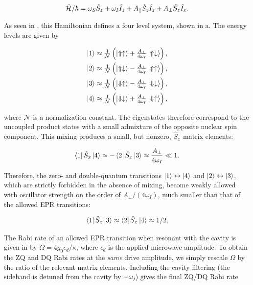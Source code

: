 \begin{equation}
    \hat{\mathcal{H}}_{\text{}}/\hbar = \omega_S \hat{S}_z + \omega_I \hat{I}_z + A_\parallel \hat{S}_z \hat{I}_z + A_\perp \hat{S}_z \hat{I}_x.
\end{equation}

As seen in , this Hamiltonian defines a four level system, shown in a. The energy levels are given by

\begin{align}
\begin{split}
    \ket{1} &\approx \tfrac{1}{\mathcal{N}}\left(\ket{\Uparrow\uparrow}     + \tfrac{A_\perp}{4\omega_I} \ket{\Uparrow\downarrow}\right) , \\
    \ket{2} &\approx \tfrac{1}{\mathcal{N}}\left(\ket{\Uparrow\downarrow}   - \tfrac{A_\perp}{4\omega_I} \ket{\Uparrow\uparrow}\right), \\
    \ket{3} &\approx \tfrac{1}{\mathcal{N}}\left(\ket{\Downarrow\uparrow}   - \tfrac{A_\perp}{4\omega_I} \ket{\Downarrow\downarrow}\right) , \\
    \ket{4} &\approx \tfrac{1}{\mathcal{N}}\left(\ket{\Downarrow\downarrow} + \tfrac{A_\perp}{4\omega_I} \ket{\Downarrow\uparrow}\right),
\end{split}
\end{align}


where $\mathcal{N}$ is a normalization constant. The eigenstates therefore correspond to the uncoupled product states with a small admixture of the opposite nuclear spin component. This mixing produces a small, but nonzero, $\hat{S}_x$ matrix elements:

\begin{equation}
    \bra{1} \hat{S}_x \ket{4} \approx - \bra{2} \hat{S}_x \ket{3} \approx \frac{A_\perp}{4\omega_I} \ll 1.
    \label{eq:zq_dq_matrix_elements}
\end{equation}

Therefore, the zero- and double-quantum transitions $\ket{1}\leftrightarrow\ket{4}$ and $\ket{2}\leftrightarrow\ket{3}$, which are strictly forbidden in the absence of mixing, become weakly allowed with oscillator strength on the order of $A_\perp/(4\omega_I)$, much smaller than that of the allowed EPR transitions:

\begin{equation}
    \bra{1} \hat{S}_x \ket{3} \approx \bra{2} \hat{S}_x \ket{4} \approx 1/2,
\end{equation}

The Rabi rate of an allowed EPR transition when resonant with the cavity is given in  by $\Omega = 4g_0 \epsilon_d / \kappa$, where $\epsilon_d$ is the applied microwave amplitude. To obtain the ZQ and DQ Rabi rates at the \textit{same} drive amplitude, we simply rescale $\Omega$ by the ratio of the relevant matrix elements. Including the cavity filtering (the sideband is detuned from the cavity by $\sim\omega_I$) gives the final ZQ/DQ Rabi rate

